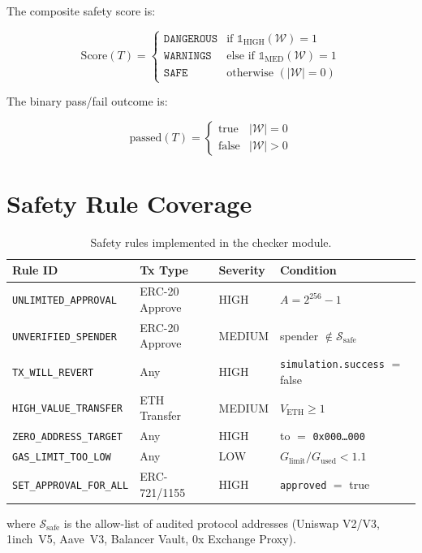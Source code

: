 \documentclass{article}
\begin{document}
The composite safety score is:

\begin{equation}
  \text{Score}(T) =
  \begin{cases}
    \texttt{DANGEROUS} & \text{if } \mathbb{1}_{\text{HIGH}}(\mathcal{W}) = 1 \\[4pt]
    \texttt{WARNINGS}  & \text{else if } \mathbb{1}_{\text{MED}}(\mathcal{W}) = 1 \\[4pt]
    \texttt{SAFE}      & \text{otherwise } (|\mathcal{W}| = 0)
  \end{cases}
\end{equation}

The binary pass/fail outcome is:

\begin{equation}
  \text{passed}(T) =
  \begin{cases}
    \text{true}  & |\mathcal{W}| = 0 \\
    \text{false} & |\mathcal{W}| > 0
  \end{cases}
\end{equation}

\section{Safety Rule Coverage}

\begin{table}[h!]
\centering
\caption{Safety rules implemented in the checker module.}
\begin{tabular}{llll}
\toprule
\textbf{Rule ID} & \textbf{Tx Type} & \textbf{Severity} & \textbf{Condition} \\
\midrule
\texttt{UNLIMITED\_APPROVAL}     & ERC-20 Approve  & HIGH   & \(A = 2^{256}-1\) \\
\texttt{UNVERIFIED\_SPENDER}     & ERC-20 Approve  & MEDIUM & spender \(\notin \mathcal{S}_{\text{safe}}\) \\
\texttt{TX\_WILL\_REVERT}        & Any             & HIGH   & \texttt{simulation.success} \(=\) false \\
\texttt{HIGH\_VALUE\_TRANSFER}   & ETH Transfer    & MEDIUM & \(V_{\text{ETH}} \geq 1\) \\
\texttt{ZERO\_ADDRESS\_TARGET}   & Any             & HIGH   & to \(=\) \texttt{0x000\ldots000} \\
\texttt{GAS\_LIMIT\_TOO\_LOW}    & Any             & LOW    & \(G_{\text{limit}} / G_{\text{used}} < 1.1\) \\
\texttt{SET\_APPROVAL\_FOR\_ALL} & ERC-721/1155    & HIGH   & \texttt{approved} \(=\) true \\
\bottomrule
\end{tabular}
\end{table}

\noindent where \(\mathcal{S}_{\text{safe}}\) is the allow-list of audited
protocol addresses (Uniswap V2/V3, 1inch~V5, Aave~V3, Balancer Vault,
0x Exchange Proxy).
\end{document}
